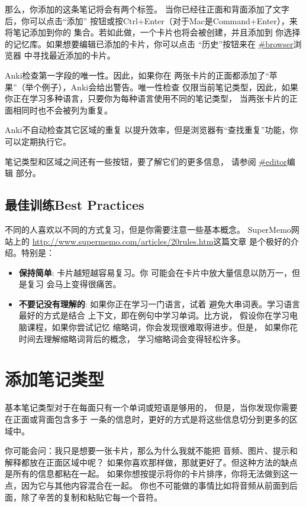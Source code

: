 \documentclass[a4paper]{book}
\begin{document}
	那么，你添加的这条笔记将会有两个标签。
	当你已经往正面和背面添加了文字后，你可以点击“添加” 按钮或按Ctrl+Enter（对于Mac是Command+Enter），来将笔记添加到你的 集合。若如此做，一个卡片也将会被创建，并且添加到 你选择的记忆库。如果想要编辑已添加的卡片，你可以点击 “历史”按钮来在 \url{#browser}浏览器 中寻找最近添加的卡片。
	
	Anki检查第一字段的唯一性。因此，如果你在 两张卡片的正面都添加了“苹果”（举个例子），Anki会给出警告。唯一性检查 仅限当前笔记类型，因此，如果你正在学习多种语言，只要你为每种语言使用不同的笔记类型， 当两张卡片的正面相同时也不会被列为重复。
	
	Anki不自动检查其它区域的重复 以提升效率，但是浏览器有“查找重复”功能，你可以定期执行它。
	
	笔记类型和区域之间还有一些按钮，要了解它们的更多信息， 请参阅
	\url{#editor}编辑 部分。
	
	\subsection{最佳训练Best Practices}
	
	不同的人喜欢以不同的方式复习，但是你需要注意一些基本概念。 SuperMemo网站上的 \url{http://www.supermemo.com/articles/20rules.htm}这篇文章 是个极好的介绍。特别是：
	
	\begin{itemize}
		\itemsep1pt\parskip0pt
		\item \textbf{保持简单}: 卡片越短越容易复习。你 可能会在卡片中放大量信息以防万一，但是复习 会马上变得很痛苦。
		\item \textbf{不要记没有理解的}: 如果你正在学习一门语言，试着 避免大串词表。学习语言最好的方式是结合 上下文，即在例句中学习单词。比方说， 假设你在学习电脑课程，如果你尝试记忆 缩略词，你会发现很难取得进步。但是， 如果你花时间去理解缩略词背后的概念， 学习缩略词会变得轻松许多。
	\end{itemize}
	
	\section{添加笔记类型}
	
	基本笔记类型对于在每面只有一个单词或短语是够用的， 但是，当你发现你需要在正面或背面包含多于 一条的信息时，更好的方式是将这些信息切分到更多的区域中。
	
	你可能会问：我只是想要一张卡片，那么为什么我就不能把 音频、图片、提示和解释都放在正面区域中呢？ 如果你喜欢那样做，那就更好了。但这种方法的缺点是所有的信息都粘在一起。 如果你想按提示将你的卡片排序，你将无法做到这一点，因为它与其他内容混合在一起。 你也不可能做的事情比如将音频从前面到后面，除了辛苦的复制和粘贴它每一个音符。
	
\end{document}
